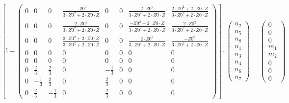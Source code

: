 \[ \left[ \mathbb{I}  - \left(\begin{array}{cccccccc} 0 & 0 & 0 &
\frac{-Z0^2}{3\cdot Z0^2+2\cdot Z0\cdot Z} & 0 & 0 & \frac{2\cdot
Z0^2}{3\cdot Z0^2+2\cdot Z0\cdot Z} & \frac{2\cdot Z0^2+2\cdot Z0\cdot
Z}{3\cdot Z0^2+2\cdot Z0\cdot Z} \\ 0 & 0 & 0 & \frac{2\cdot
Z0^2}{3\cdot Z0^2+2\cdot Z0\cdot Z} & 0 & 0 & \frac{-Z0^2+2\cdot
Z0\cdot Z}{3\cdot Z0^2+2\cdot Z0\cdot Z} & \frac{2\cdot Z0^2}{3\cdot
Z0^2+2\cdot Z0\cdot Z} \\ 0 & 0 & 0 & \frac{2\cdot Z0^2+2\cdot Z0\cdot
Z}{3\cdot Z0^2+2\cdot Z0\cdot Z} & 0 & 0 & \frac{2\cdot Z0^2}{3\cdot
Z0^2+2\cdot Z0\cdot Z} & \frac{-Z0^2}{3\cdot Z0^2+2\cdot Z0\cdot Z} \\
0 & 0 & 0 & 0 & 0 & 0 & 0 & 0 \\ 0 & 0 & 0 & 0 & 0 & 0 & 0 & 0 \\ 0 &
\frac{2}{3} & \frac{2}{3} & 0 & -\frac{1}{3} & 0 & 0 & 0 \\ 0 &
-\frac{1}{3} & \frac{2}{3} & 0 & \frac{2}{3} & 0 & 0 & 0 \\ 0 &
\frac{2}{3} & -\frac{1}{3} & 0 & \frac{2}{3} & 0 & 0 & 0
\end{array}\right)\right] \cdot \left(\begin{array}{c} n_{2} \\ n_{5}
\\ n_{8} \\ n_{1} \\ n_{3} \\ n_{4} \\ n_{6} \\ n_{7}
\end{array}\right) = \left(\begin{array}{c} 0 \\ 0 \\ 0 \\ m_{1} \\
m_{2} \\ 0 \\ 0 \\ 0 \end{array}\right) \]
